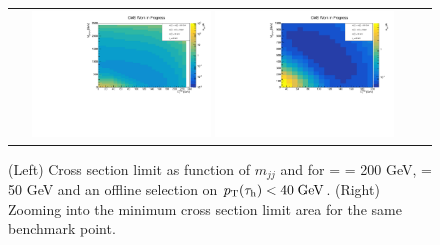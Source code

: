\begin{figure}[tbh!]
	\centering
	\begin{tabular}{cc}
		\includegraphics[width=0.45\textwidth]{analysis/pics/JetInvMass_vs_MET_xsec_chi200_lsp050_taupt40.pdf}
		\includegraphics[width=0.45\textwidth]{analysis/pics/JetInvMass_vs_MET_xsec_chi200_lsp050_taupt40_zoom.pdf} 		
	\end{tabular}
	\caption{(Left) Cross section limit as function of $m_{jj}$ and \met for \charginopm = \neutralinotwo = 200 GeV, \neutralinoone = 50 GeV and an offline selection on $p_{\text{T}}(\tau_{\text{h}}) <  40\;\text{Ge}\kern-0.06667em\text{V}$. (Right) Zooming into the minimum cross section limit area for the same benchmark point.}
	\label{fig::JetInvMass_vs_MET_xsec_chi200_lsp050_taupt40}
\end{figure}

